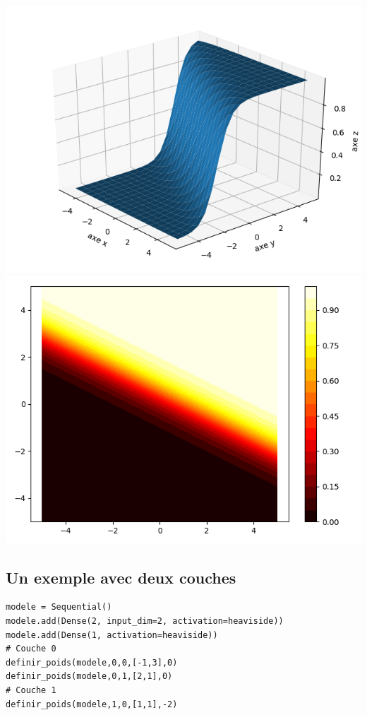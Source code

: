 \documentclass[11pt,class=report,crop=false]{standalone}
\begin{document}
\begin{center}
\includegraphics[scale=\myscale,scale=0.5]{figures/pythontf-2var-3d-01}
\includegraphics[scale=\myscale,scale=0.4]{figures/pythontf-2var-2d-01}
\end{center}


\subsection{Un exemple avec deux couches}


\begin{lstlisting}
modele = Sequential()
modele.add(Dense(2, input_dim=2, activation=heaviside))
modele.add(Dense(1, activation=heaviside))
# Couche 0
definir_poids(modele,0,0,[-1,3],0)
definir_poids(modele,0,1,[2,1],0)
# Couche 1
definir_poids(modele,1,0,[1,1],-2) 
\end{lstlisting}
\end{document}
